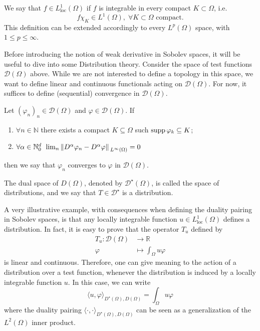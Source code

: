\begin{definition}
    We say that \(f \in L^1_{\text{loc}}(\Omega)\) if \(f\) is integrable in every compact \(K \subset \Omega\), i.e.
    \[
        f \chi _K \in L^1(\Omega), \; \forall K \subset \Omega \text{ compact}.
    \]
    This definition can be extended accordingly to every \(L^p (\Omega)\) space, with \(1 \leq p \leq \infty\).
\end{definition}
Before introducing the notion of weak derivative in Sobolev spaces, it will be useful to dive into some Distribution theory. Consider the space of test functions \(\mathcal{D}(\Omega)\) above.
While we are not interested to define a topology in this space, we want to define linear and continuous functionals acting on \(\mathcal{D}(\Omega)\). For now, it suffices to define (sequential) convergence in \(\mathcal{D}(\Omega)\).
\begin{definition}
    Let \((\varphi_n)_n \in \mathcal{D}(\Omega)\) and \(\varphi \in \mathcal{D}(\Omega)\). If 
    \begin{enumerate}
        \item   \(\forall n \in \mathbb{N}\) there exists a compact \(K \subseteq \Omega\) such \(\operatorname{supp} \varphi_k \subseteq K\);
        \item \(\forall \alpha \in \mathbb{N}_0^d\, \; \lim_n \norm*{D^\alpha \varphi_n - D^\alpha \varphi}_{L^\infty(\Omega)} = 0\)
    \end{enumerate}
    then we say that \(\varphi_n\) converges to \(\varphi\) in \(\mathcal{D}(\Omega)\).
\end{definition}
\begin{definition}
    The dual space of \(D(\Omega)\), denoted by \(\mathcal{D}^\star(\Omega)\), is called the space of distributions, and we say that \(T \in \mathcal{D}^\star\) is a distribution.
\end{definition}
A very illustrative example, with consequences when defining the duality pairing in Sobolev spaces, is that any locally integrable function \(u \in L^1_{\text{loc}}(\Omega)\) defines a distribution. In fact, it is easy to prove that the operator \(T_u\) defined by
\begin{align*}
    T_u: \mathcal{D}(\Omega) &\rightarrow \mathbb{R}\\
    \varphi &\mapsto \int_\Omega u \varphi
\end{align*}
is linear and continuous. Therefore, one can give meaning to the action of a distribution over a test function, whenever the distribution is induced by a locally integrable function \(u\). In this case, we can write
\[
    \langle u, \varphi \rangle_{D^\star(\Omega), D(\Omega)} = \int_\Omega u \varphi
\]
where the duality pairing \( \langle \cdot , \cdot \rangle_{D^\star(\Omega), D(\Omega)}\) can be seen as a generalization of the \(L^2(\Omega)\) inner product.

